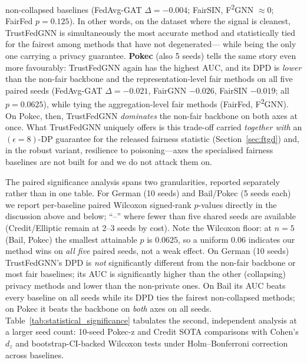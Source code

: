 \documentclass[pdflatex,sn-mathphys-num]{sn-jnl}
\theoremstyle{thmstyleone}%
\theoremstyle{thmstyletwo}%
\theoremstyle{thmstylethree}%
\begin{document}
non-collapsed baselines (FedAvg-GAT $\Delta{=}-0.004$; FairSIN, F\textsuperscript{2}GNN
$\approx 0$; FairFed $p{=}0.125$). In other words, on the dataset where the
signal is cleanest, TrustFedGNN is simultaneously the most accurate method and
statistically tied for the fairest among methods that have not degenerated---
while being the only one carrying a privacy guarantee. \textbf{Pokec} (also 5
seeds) tells the same story even more favourably: TrustFedGNN again has the
highest AUC, and its DPD is \emph{lower} than the non-fair backbone and the
representation-level fair methods on all five paired seeds
(FedAvg-GAT $\Delta{=}-0.021$, FairGNN $-0.026$, FairSIN $-0.019$; all
$p{=}0.0625$), while tying the aggregation-level fair methods (FairFed, F\textsuperscript{2}GNN).
On Pokec, then, TrustFedGNN \emph{dominates} the non-fair backbone on both axes
at once. What TrustFedGNN uniquely offers is this trade-off carried
\emph{together with} an $(\epsilon{=}8)$-DP guarantee for the released fairness
statistic (Section~\ref{sec:ftgd}) and, in the robust variant, resilience to
poisoning---axes the specialised fairness baselines are not built for and we do
not attack them on.

The paired significance analysis spans two granularities, reported
separately rather than in one table. For German (10 seeds) and Bail/Pokec (5
seeds each) we report per-baseline paired Wilcoxon signed-rank $p$-values
directly in the discussion above and below; ``--'' where fewer than five
shared seeds are available (Credit/Elliptic remain at 2--3 seeds by cost).
Note the Wilcoxon floor: at $n{=}5$ (Bail, Pokec) the smallest attainable $p$
is $0.0625$, so a uniform $0.06$ indicates our method wins on \emph{all five}
paired seeds, not a weak effect. On German (10 seeds) TrustFedGNN's DPD is
\emph{not} significantly different from the non-fair backbone or most fair
baselines; its AUC is significantly higher than the other (collapsing)
privacy methods and lower than the non-private ones. On Bail its AUC beats
every baseline on all seeds while its DPD ties the fairest non-collapsed
methods; on Pokec it beats the backbone on \emph{both} axes on all seeds.
Table~\ref{tab:statistical_significance} tabulates the second, independent
analysis at a larger seed count: 10-seed Pokec-z and Credit SOTA comparisons
with Cohen's $d_z$ and bootstrap-CI-backed Wilcoxon tests under
Holm--Bonferroni correction across baselines.

{\footnotesize\setlength{\tabcolsep}{4pt}}
\end{document}
